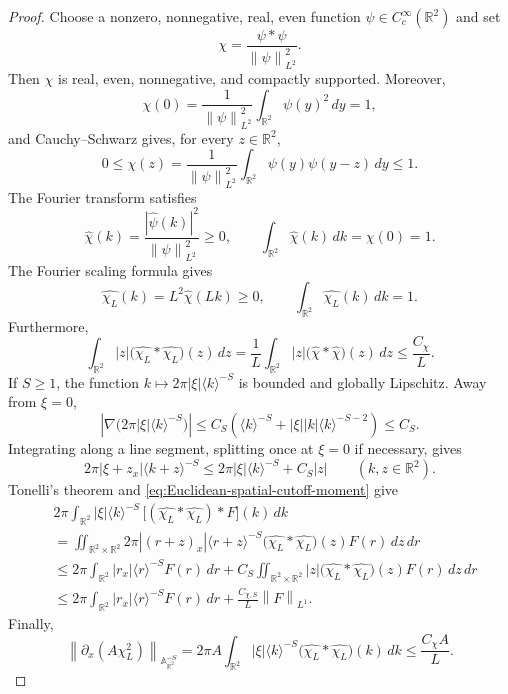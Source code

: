 \documentclass[12pt,reqno,letterpaper]{amsart}
\numberwithin{equation}{section}
\theoremstyle{definition}
\newcommand{\R}{\mathbb R}
\newcommand{\A}{\mathbb A}
\newcommand{\norm}[1]{\left\lVert #1\right\rVert}
\newcommand{\abs}[1]{\left\lvert #1\right\rvert}
\begin{document}
\begin{proof}
Choose a nonzero, nonnegative, real, even function
$\psi\in C_c^\infty(\R^2)$ and set
\[
   \chi=\frac{\psi*\psi}{\norm\psi_{L^2}^2}.
\]
Then $\chi$ is real, even, nonnegative, and compactly supported.  Moreover,
\[
   \chi(0)=\frac{1}{\norm\psi_{L^2}^2}
       \int_{\R^2}\psi(y)^2\,dy=1,
\]
and Cauchy--Schwarz gives, for every $z\in\R^2$,
\[
   0\leq\chi(z)
    =\frac{1}{\norm\psi_{L^2}^2}
       \int_{\R^2}\psi(y)\psi(y-z)\,dy
    \leq1.
\]
The Fourier transform satisfies
\[
   \widehat\chi(k)
      =\frac{\abs{\widehat\psi(k)}^2}{\norm\psi_{L^2}^2}\geq0,
   \qquad
   \int_{\R^2}\widehat\chi(k)\,dk=\chi(0)=1.
\]
The Fourier scaling formula gives
\[
   \widehat{\chi_L}(k)=L^2\widehat\chi(Lk)\geq0,
   \qquad \int_{\R^2}\widehat{\chi_L}(k)\,dk=1.
\]
Furthermore,
\[
 \int_{\R^2}\abs z
      \bigl(\widehat{\chi_L}*\widehat{\chi_L}\bigr)(z)\,dz
 =\frac1L\int_{\R^2}\abs z
      \bigl(\widehat\chi*\widehat\chi\bigr)(z)\,dz
 \leq\frac{C_\chi}{L}.
\]
If $S\geq1$, the function
$k\mapsto2\pi\abs\xi\langle k\rangle^{-S}$ is bounded and globally
Lipschitz.  Away from $\xi=0$,
\[
   \abs{\nabla\bigl(2\pi\abs\xi\langle k\rangle^{-S}\bigr)}
   \leq C_S\left(\langle k\rangle^{-S}
       +\abs\xi\abs k\langle k\rangle^{-S-2}\right)
   \leq C_S.
\]
Integrating along a line segment, splitting once at $\xi=0$ if necessary,
gives
\begin{equation*}
   2\pi\abs{\xi+z_x}\langle k+z\rangle^{-S}
   \leq2\pi\abs\xi\langle k\rangle^{-S}+C_S\abs z
   \qquad(k,z\in\R^2).
\end{equation*}
Tonelli's theorem and \eqref{eq:Euclidean-spatial-cutoff-moment} give
\begin{align*}
 &2\pi\int_{\R^2}\abs\xi\langle k\rangle^{-S}\,
       \bigl[(\widehat{\chi_L}*\widehat{\chi_L})*F\bigr](k)\,dk\\
 &=\iint_{\R^2\times\R^2}
       2\pi\abs{(r+z)_x}\langle r+z\rangle^{-S}
       \bigl(\widehat{\chi_L}*\widehat{\chi_L}\bigr)(z)
       F(r)\,dz\,dr\\
 &\leq2\pi\int_{\R^2}\abs{r_x}\langle r\rangle^{-S}F(r)\,dr
   +C_S\iint_{\R^2\times\R^2}
       \abs z
       \bigl(\widehat{\chi_L}*\widehat{\chi_L}\bigr)(z)
       F(r)\,dz\,dr\\
 &\leq2\pi\int_{\R^2}\abs{r_x}\langle r\rangle^{-S}F(r)\,dr
   +\frac{C_{\chi,S}}{L}\norm F_{L^1}.
\end{align*}
Finally,
\[
 \norm{\partial_x(A\chi_L^2)}_{\A^{-S}_{\R^2}}
 =2\pi A\int_{\R^2}\abs\xi\langle k\rangle^{-S}
       \bigl(\widehat{\chi_L}*\widehat{\chi_L}\bigr)(k)\,dk
 \leq\frac{C_\chi A}{L}.
\]
\end{proof}
\end{document}
